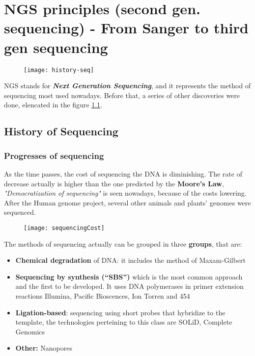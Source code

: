 \graphicspath{{chapters/images/03/}}

\chapter{NGS principles (second gen. sequencing) - From Sanger to third gen sequencing}

\begin{figure}[h]
\caption{}
\texttt{[image: history-seq]}
\label{discoveries-sequencing}
\end{figure}

NGS stands for \textbf{\textit{Next Generation Sequencing}}, and it represents the method of sequencing most used nowadays. Before that, a series of other discoveries were done, elencated in the figure \ref{discoveries-sequencing}.

\section{History of Sequencing}
\subsection{Progresses of sequencing}
As the time passes, the cost of sequencing the DNA is diminishing. The rate of decrease actually is higher than the one predicted by the \textbf{Moore's Law}, \textit{"Democratization of sequencing"} is seen nowadays, because of the costs lowering. After the Human genome project, several other animals and plants' genomes were sequenced.

\begin{figure}[h]
\caption{}
\centering
\texttt{[image: sequencingCost]}
\label{Moore's law graph}
\end{figure}

The methods of sequencing actually can be grouped in three \textbf{groups}, that are:

\begin{itemize}
	\item \textbf{Chemical degradation} of DNA: it includes the method of Maxam-Gilbert
	\item \textbf{Sequencing by synthesis (“SBS”)} which is the most common approach and the first to be developed. It uses DNA polymerases in primer extension reactions Illumina, Pacific Bioscences, Ion Torren and 454
	\item \textbf{Ligation-based}: sequencing using short probes that hybridize to the template, the technologies perteining to this class are SOLiD, Complete Genomics
	\item \textbf{Other:} Nanopores
\end{itemize}

